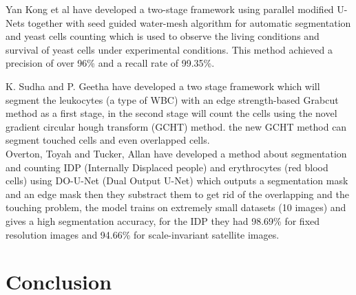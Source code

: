 Yan Kong et al \textsuperscript{\cite{Kong:20}} have developed a two-stage framework using parallel modified U-Nets together with seed guided water-mesh algorithm for automatic segmentation and yeast cells counting which is used to observe the living conditions and survival of yeast cells under experimental conditions. This method achieved a precision of over 96\% and a recall rate of 99.35\%.

\newpage

K. Sudha and P. Geetha \textsuperscript{\cite{SUDHA2020639}} have developed a two stage framework which will segment the leukocytes (a type of WBC) with an edge strength-based Grabcut method as a first stage, in the second stage will count the cells using the novel gradient circular hough transform (GCHT) method. the new GCHT method can segment touched cells and even overlapped cells.\\

Overton, Toyah and Tucker, Allan \textsuperscript{\cite{10.1007/978-3-030-44584-3_31}} have developed a method about segmentation and counting IDP (Internally Displaced people) and erythrocytes (red blood cells) using DO-U-Net (Dual Output U-Net) which outputs a segmentation mask and an edge mask then they substract them to get rid of the overlapping and the touching problem, the model trains on extremely small datasets (10 images) and gives a high segmentation accuracy, for the IDP they had 98.69\% for fixed resolution images and 94.66\% for scale-invariant satellite images.

\section{Conclusion}
\vspace{0.1in}
\hspace*{0.16in}
